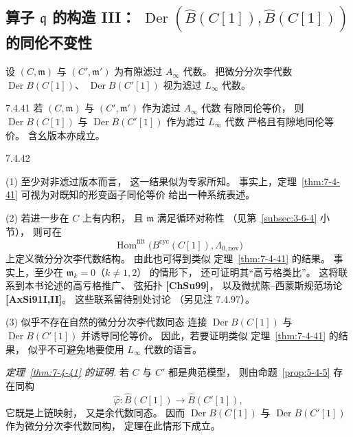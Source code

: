
\subsection{算子 $\mathfrak q$ 的构造 III：
$\operatorname{Der}(\widehat B(C[1]),\widehat B(C[1]))$
的同伦不变性}
\label{subsec:7-4-4}

设 $(C,\mathfrak m)$ 与
$(C',\mathfrak m')$ 为有隙滤过
$A_\infty$ 代数。
把微分分次李代数
$\operatorname{Der}B(C[1])$、
$\operatorname{Der}B(C'[1])$
视为滤过 $L_\infty$ 代数。

\begin{theorem}{7.4.41}\label{thm:7-4-41}
若 $(C,\mathfrak m)$ 与
$(C',\mathfrak m')$
作为滤过 $A_\infty$ 代数
有隙同伦等价，
则
$\operatorname{Der}B(C[1])$
与
$\operatorname{Der}B(C'[1])$
作为滤过 $L_\infty$ 代数
严格且有隙地同伦等价。
含幺版本亦成立。
\end{theorem}

\begin{remark}{7.4.42}\label{rem:7-4-42}
\par\noindent\textup{(1)}\quad
至少对非滤过版本而言，
这一结果似为专家所知。
事实上，定理~\ref{thm:7-4-41}
可视为对既知的形变函子同伦等价
给出一种系统表述。

\par\noindent\textup{(2)}\quad
若进一步在 $C$ 上有内积，
且 $\mathfrak m$ 满足循环对称性
（见第~\ref{subsec:3-6-4} 小节），
则可在
\[
\operatorname{Hom}^{\mathrm{filt}}
\bigl(B^{\mathrm{cyc}}(C[1]),
\Lambda_{0,\mathrm{nov}}\bigr)
\]
上定义微分分次李代数结构。
由此也可得到类似
定理~\ref{thm:7-4-41} 的结果。
事实上，至少在
$\mathfrak m_k=0$（$k\ne1,2$）
的情形下，
还可证明其“高亏格类比”。
这将联系到本书论述的高亏格推广、
弦拓扑 \textbf{[ChSu99]}，
以及微扰陈--西蒙斯规范场论
\textbf{[AxSi91I,II]}。
这些联系留待别处讨论
（另见注 7.4.97）。

\par\noindent\textup{(3)}\quad
似乎不存在自然的微分分次李代数同态
连接
$\operatorname{Der}B(C[1])$
与
$\operatorname{Der}B(C'[1])$
并诱导同伦等价。
因此，若要证明类似
定理~\ref{thm:7-4-41} 的结果，
似乎不可避免地要使用
$L_\infty$ 代数的语言。
\end{remark}

\par\noindent\textit{定理~\ref{thm:7-4-41} 的证明.}\quad
若 $C$ 与 $C'$ 都是典范模型，
则由命题~\ref{prop:5-4-5}
存在同构
\[
\widehat\varphi:
\widehat B(C[1])
\longrightarrow
\widehat B(C'[1]),
\]
它既是上链映射，
又是余代数同态。
因而
$\operatorname{Der}B(C[1])$
与
$\operatorname{Der}B(C'[1])$
作为微分分次李代数同构，
定理在此情形下成立。

